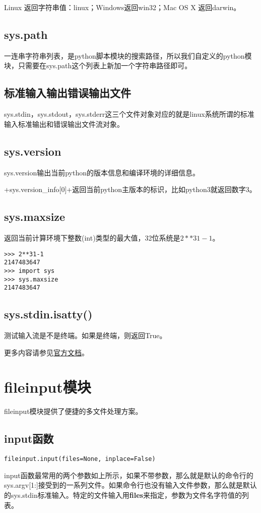 \documentclass[12pt,oneside]{book}
\begin{document}
\begin{common-format}
Linux 返回字符串值：linux；Windows返回win32；Mac OS X 返回darwin。

\section{sys.path}
一连串字符串列表，是python脚本模块的搜索路径，所以我们自定义的python模块，只需要在sys.path这个列表上新加一个字符串路径即可。

\section{标准输入输出错误输出文件}
sys.stdin，sys.stdout，sys.stderr这三个文件对象对应的就是linux系统所谓的标准输入标准输出和错误输出文件流对象。

\section{sys.version}
sys.version输出当前python的版本信息和编译环境的详细信息。

+sys.version_info[0]+返回当前python主版本的标识，比如python3就返回数字3。

\section{sys.maxsize}
返回当前计算环境下整数(int)类型的最大值，32位系统是$2**31-1$。
\begin{Verbatim}
>>> 2**31-1
2147483647
>>> import sys
>>> sys.maxsize
2147483647
\end{Verbatim}

\section{sys.stdin.isatty()}
测试输入流是不是终端。如果是终端，则返回True。


\begin{large}
更多内容请参见\href{https://docs.python.org/3/library/sys.html}{官方文档}。
\end{large}


\chapter{fileinput模块}
fileinput模块提供了便捷的多文件处理方案。

\section{input函数}
\begin{Verbatim}
fileinput.input(files=None, inplace=False)
\end{Verbatim}
input函数最常用的两个参数如上所示，如果不带参数，那么就是默认的命令行的sys.argv[1:]接受到的一系列文件。如果命令行也没有输入文件参数，那么就是默认的sys.stdin标准输入。特定的文件输入用\textbf{files}来指定，参数为文件名字符值的列表。


\end{common-format}
\end{document}
